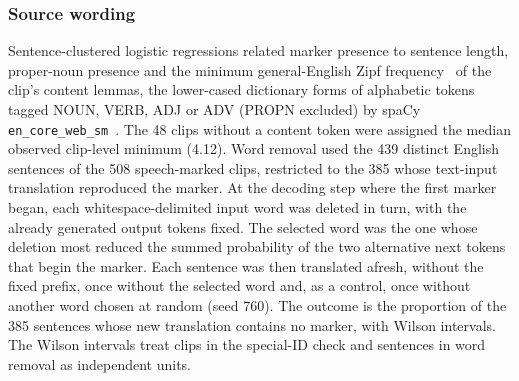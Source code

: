 \subsubsection{Source wording}
Sentence-clustered logistic regressions related marker
presence to sentence length, proper-noun presence and the minimum
general-English Zipf frequency~\cite{speer2022wordfreq} of the clip's content
lemmas, the lower-cased dictionary forms of alphabetic tokens tagged NOUN,
VERB, ADJ or ADV (PROPN excluded) by spaCy
\texttt{en\_core\_web\_sm}~\cite{honnibal2020spacy}. The 48 clips without a
content token were assigned the median observed clip-level minimum (4.12).
Word removal used the 439 distinct English sentences of the 508 speech-marked
clips, restricted to the 385 whose text-input translation reproduced the
marker. At the decoding step where the first marker began, each whitespace-delimited
input word was deleted in turn, with the already generated output tokens
fixed. The selected word was the one whose deletion most reduced the summed
probability of the two alternative next tokens that begin the marker. Each sentence was
then translated afresh, without the fixed prefix, once without the selected
word and, as a control, once without another word chosen at random (seed
760). The outcome is the proportion of the 385 sentences whose new
translation contains no marker, with Wilson intervals. The Wilson intervals
treat clips in the special-ID check and sentences in word removal as
independent units.
